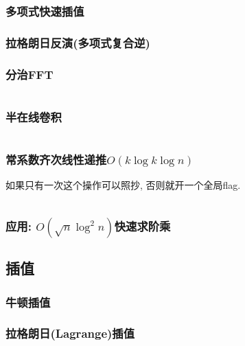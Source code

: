 \documentclass[a4paper, twoside]{article}
\begin{document}
\begin{multicols}{2}
				\subsubsection{多项式快速插值}
					



				\subsubsection{拉格朗日反演(多项式复合逆)}
					

				\subsubsection{分治FFT}
					\inputminted{cpp}{../src/math/分治FFT.cpp}

				\subsubsection{半在线卷积}
					\inputminted{cpp}{../src/math/半在线卷积.cpp}
				
				\subsubsection{常系数齐次线性递推$O(k\log k\log n)$}
					如果只有一次这个操作可以照抄, 否则就开一个全局flag.
					\inputminted{cpp}{../src/math/常系数齐次线性递推.cpp}
				
				\subsubsection{应用: $O(\sqrt n \log^2 n)$快速求阶乘}
					

			\subsection{插值}
				\subsubsection{牛顿插值}
					

				\subsubsection{拉格朗日(Lagrange)插值}
					
				

\end{multicols}
\end{document}
